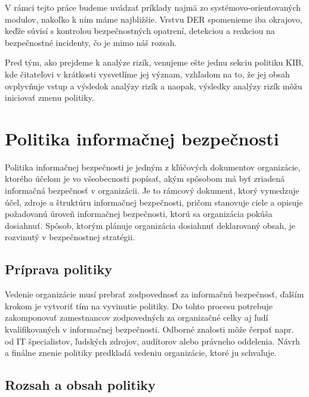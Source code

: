 

V rámci tejto práce budeme uvádzať príklady najmä zo systémovo-orientovaných modulov, nakoľko k ním máme najbližšie. Vrstvu DER spomenieme iba
okrajovo, keďže súvisí s kontrolou bezpečnostných opatrení, detekciou a reakciou na bezpečnostné incidenty, čo je mimo náš rozsah.

Pred tým, ako prejdeme k analýze rizík, venujeme ešte jednu sekciu politiku KIB, kde čitateľovi v krátkosti vysvetlíme jej význam, vzhľadom
na to, že jej obsah ovplyvňuje vstup a výsledok analýzy rizík a naopak, výsledky analýzy rizík môžu iniciovať zmenu politiky.

\section{Politika informačnej bezpečnosti}
Politika informačnej bezpečnosti je jedným z kľúčových dokumentov organizácie, ktorého účelom je vo všeobecnosti popísať, akým spôsobom má byť
zriadená informačná bezpečnosť v organizácii. Je to rámcový dokument, ktorý vymedzuje účel, zdroje a štruktúru informačnej bezpečnosti, pričom
stanovuje ciele a opisuje požadovanú úroveň informačnej bezpečnosti, ktorú sa organizácia pokúša dosiahnuť. Spôsob, ktorým plánuje organizácia
dosiahnuť deklarovaný obsah, je rozvinutý v bezpečnostnej stratégii.

\subsection*{Príprava politiky}
 
Vedenie organizácie musí prebrať zodpovednosť za informačnú bezpečnosť, ďalším krokom je vytvoriť tím na vyvinutie politiky. Do tohto procesu
potrebuje zakomponovať zamestnancov zodpovedných za organizačné celky aj ľudí kvalifikovaných v informačnej bezpečnosti. Odborné znalosti
môže čerpať napr. od IT špecialistov, ľudských zdrojov, audítorov alebo právneho oddelenia. Návrh a finálne znenie politiky predkladá
vedeniu organizácie, ktoré ju schvaľuje.

\subsection*{Rozsah a obsah politiky}


